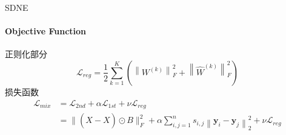 \documentclass{beamer}
\begin{document}
\begin{frame}{SDNE}
    \framesubtitle{Objective Function}
    正则化部分
    $$
    \mathcal{L}_{r e g}=\frac{1}{2} \sum_{k=1}^{K}\left(\left\|W^{(k)}\right\|_{F}^{2}+\left\|\hat{W}^{(k)}\right\|_{F}^{2}\right)
    $$
    损失函数
    $$
    \begin{aligned}
    \mathcal{L}_{m i x} &=\mathcal{L}_{2 n d}+\alpha \mathcal{L}_{1 s t}+\nu \mathcal{L}_{r e g} \\
    &=\|(\hat{X}-X) \odot B\|_{F}^{2}+\alpha \sum_{i, j=1}^{n} s_{i, j}\left\|\mathbf{y}_{i}-\mathbf{y}_{j}\right\|_{2}^{2}+\nu \mathcal{L}_{r e g}
    \end{aligned}
    $$
\end{frame}
\end{document}
